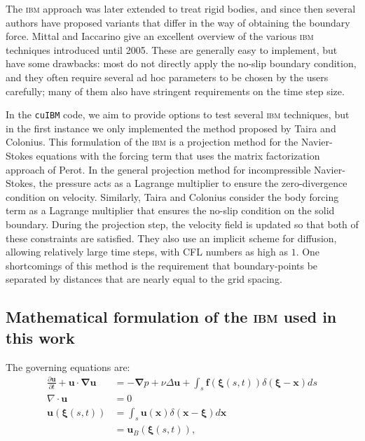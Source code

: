 \documentclass{tufte-handout}
\newcommand{\cuibm}{\Verb|cuIBM|\xspace}
\newcommand{\ibm}{\textsc{ibm}\xspace}
\begin{document}
The \ibm approach was later extended to treat rigid bodies, and since then several authors have proposed variants that differ in the way of obtaining the boundary force.  Mittal and Iaccarino give an excellent overview of the various \ibm techniques introduced until 2005.\cite{Mittal2005} 
These are generally easy to implement, but have some drawbacks: most do not directly apply the no-slip boundary condition, and they often require several ad hoc parameters to be chosen by the users carefully; many of them also have stringent requirements on the time step size.

 In the \cuibm code, we aim to provide options to test several \ibm techniques, but in the first instance we only implemented the method proposed by Taira and Colonius.\cite{Taira2007} This formulation of the \ibm is a projection method for the Navier-Stokes equations with the forcing term that uses the matrix factorization approach of Perot.\cite{Perot1993} 
In the general projection method for incompressible Navier-Stokes, the pressure acts as a Lagrange multiplier to ensure the zero-divergence condition on velocity. Similarly, Taira and Colonius consider the body forcing term as a Lagrange multiplier that ensures the no-slip condition on the solid boundary. During the projection step, the velocity field is updated so that both of these constraints are satisfied. They also use an implicit scheme for diffusion, allowing relatively large time steps, with CFL numbers as high as $1$. One shortcomings of this method is the requirement that boundary-points be separated by distances that are nearly equal to the grid spacing.



\subsection{Mathematical formulation of the \ibm used in this work}\label{s:ibm}

The governing equations are:
%
\begin{subequations}
\begin{align}
\frac{\partial{\mathbf{u}}}{\partial{t}}+\mathbf{u}\cdot\boldsymbol{\nabla}\mathbf{u} & = -\boldsymbol{\nabla}{p}+\nu\Delta\mathbf{u}  +\int_s\mathbf{f}(\boldsymbol{\xi}(s,t))\delta(\boldsymbol{\xi}-\mathbf{x})ds \label{ns1} \\
\nabla\cdot\mathbf{u} & = 0 \label{ns2} \\
\mathbf{u}(\boldsymbol{\xi}(s,t)) & = \int_s\mathbf{u}(\mathbf{x})\delta(\mathbf{x}-\boldsymbol{\xi})d\mathbf{x} \nonumber \\
& = \mathbf{u}_B(\boldsymbol{\xi}(s,t)), \label{ns3}
\end{align}
\end{subequations}
\end{document}
